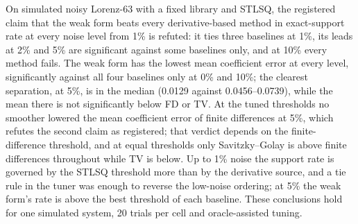 On simulated noisy Lorenz-63 with a fixed library and STLSQ, the registered claim that the weak form beats every derivative-based method in exact-support rate at every noise level from 1\% is refuted: it ties three baselines at 1\%, its leads at 2\% and 5\% are significant against some baselines only, and at 10\% every method fails. The weak form has the lowest mean coefficient error at every level, significantly against all four baselines only at 0\% and 10\%; the clearest separation, at 5\%, is in the median (0.0129 against 0.0456--0.0739), while the mean there is not significantly below FD or TV. At the tuned thresholds no smoother lowered the mean coefficient error of finite differences at 5\%, which refutes the second claim as registered; that verdict depends on the finite-difference threshold, and at equal thresholds only Savitzky--Golay is above finite differences throughout while TV is below. Up to 1\% noise the support rate is governed by the STLSQ threshold more than by the derivative source, and a tie rule in the tuner was enough to reverse the low-noise ordering; at 5\% the weak form's rate is above the best threshold of each baseline. These conclusions hold for one simulated system, 20 trials per cell and oracle-assisted tuning.
